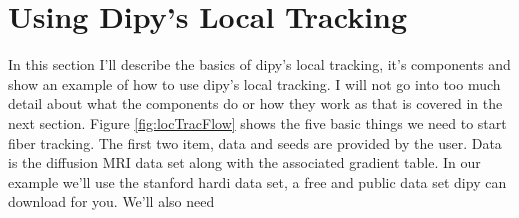 \section{Using Dipy's Local Tracking}
    In this section I'll describe the basics of dipy's local tracking, it's components and show an example of how to use dipy's local tracking. I will not go into too much detail about what the components do or how they work as that is covered in the next section. Figure \ref{fig:locTracFlow} shows the five basic things we need to start fiber tracking. The first two item, data and seeds are provided by the user. Data is the diffusion MRI data set along with the associated gradient table. In our example we'll use the stanford hardi data set, a free and public data set dipy can download for you. We'll also need 